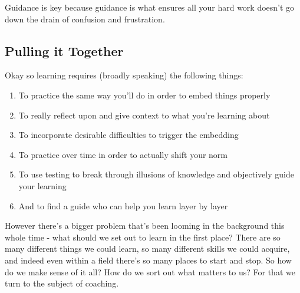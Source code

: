 \documentclass[11pt]{book}
\begin{document}
Guidance is key because guidance is what ensures all your hard work doesn't go down the drain of confusion and frustration.

\subsection{Pulling it Together}
Okay so learning requires (broadly speaking) the following things:

\begin{enumerate}
\item To practice the same way you'll do in order to embed things properly
\item To really reflect upon and give context to what you're learning about
\item To incorporate desirable difficulties to trigger the embedding
\item To practice over time in order to actually shift your norm
\item To use testing to break through illusions of knowledge and objectively guide your learning
\item And to find a guide who can help you learn layer by layer
\end{enumerate}

However there's a bigger problem that's been looming in the background this whole time - what should we set out to learn in the first place? There are so many different things we could learn, so many different skills we could acquire, and indeed even within a field there's so many places to start and stop. So how do we make sense of it all? How do we sort out what matters to us? For that we turn to the subject of coaching.
\end{document}

